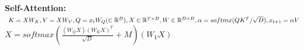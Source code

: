 \textbf{Self-Attention:} $K=XW_K, V=XW_V, Q=x_{t}W_Q (\in \mathbb{R}^{D}),\\ 
X\in \mathbb{R}^{T\times D}, W\in \mathbb{R}^{D\times D}, \alpha = softmx(QK^T/\sqrt{D}), x_{t+1} = \alpha V$\\
$X = softmax(\frac{(W_QX)(W_KX)^T}{\sqrt{D}} + M) (W_VX)$\\

\\





